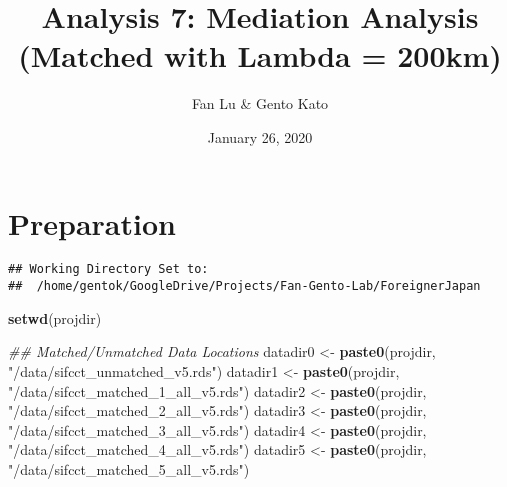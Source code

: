 \documentclass[
]{article}
\title{Analysis 7: Mediation Analysis (Matched with Lambda = 200km)}
\author{Fan Lu \& Gento Kato}
\date{January 26, 2020}
\newenvironment{Shaded}{\begin{snugshade}}{\end{snugshade}}
\newcommand{\CharTok}[1]{\textcolor[rgb]{0.31,0.60,0.02}{#1}}
\newcommand{\CommentTok}[1]{\textcolor[rgb]{0.56,0.35,0.01}{\textit{#1}}}
\newcommand{\ControlFlowTok}[1]{\textcolor[rgb]{0.13,0.29,0.53}{\textbf{#1}}}
\newcommand{\DataTypeTok}[1]{\textcolor[rgb]{0.13,0.29,0.53}{#1}}
\newcommand{\KeywordTok}[1]{\textcolor[rgb]{0.13,0.29,0.53}{\textbf{#1}}}
\newcommand{\NormalTok}[1]{#1}
\newcommand{\OperatorTok}[1]{\textcolor[rgb]{0.81,0.36,0.00}{\textbf{#1}}}
\newcommand{\OtherTok}[1]{\textcolor[rgb]{0.56,0.35,0.01}{#1}}
\newcommand{\StringTok}[1]{\textcolor[rgb]{0.31,0.60,0.02}{#1}}
\begin{document}
\maketitle

\hypertarget{preparation}{%
\section{Preparation}\label{preparation}}

\begin{Shaded}
\end{Shaded}

\begin{verbatim}
## Working Directory Set to:
##  /home/gentok/GoogleDrive/Projects/Fan-Gento-Lab/ForeignerJapan
\end{verbatim}

\begin{Shaded}
\begin{Highlighting}[]
\KeywordTok{setwd}\NormalTok{(projdir)}

\CommentTok{## Matched/Unmatched Data Locations}
\NormalTok{datadir0 <-}\StringTok{ }\KeywordTok{paste0}\NormalTok{(projdir, }\StringTok{"/data/sifcct_unmatched_v5.rds"}\NormalTok{)}
\NormalTok{datadir1 <-}\StringTok{ }\KeywordTok{paste0}\NormalTok{(projdir, }\StringTok{"/data/sifcct_matched_1_all_v5.rds"}\NormalTok{)}
\NormalTok{datadir2 <-}\StringTok{ }\KeywordTok{paste0}\NormalTok{(projdir, }\StringTok{"/data/sifcct_matched_2_all_v5.rds"}\NormalTok{)}
\NormalTok{datadir3 <-}\StringTok{ }\KeywordTok{paste0}\NormalTok{(projdir, }\StringTok{"/data/sifcct_matched_3_all_v5.rds"}\NormalTok{)}
\NormalTok{datadir4 <-}\StringTok{ }\KeywordTok{paste0}\NormalTok{(projdir, }\StringTok{"/data/sifcct_matched_4_all_v5.rds"}\NormalTok{)}
\NormalTok{datadir5 <-}\StringTok{ }\KeywordTok{paste0}\NormalTok{(projdir, }\StringTok{"/data/sifcct_matched_5_all_v5.rds"}\NormalTok{)}
\end{Highlighting}
\end{Shaded}
\end{document}
